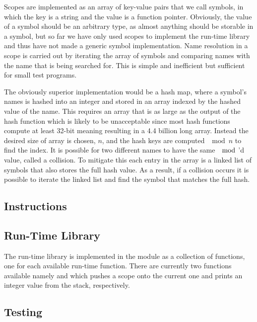 Scopes are implemented as an array of key-value pairs that we call symbols, in
which the key is a string and the value is a function pointer. Obviously, the
value of a symbol should be an arbitrary type, as almost anything should be
storable in a symbol, but so far we have only used scopes to implement the
run-time library and thus have not made a generic symbol implementation. Name
resolution in a scope is carried out by iterating the array of symbols and
comparing names with the name that is being searched for. This is simple and
inefficient but sufficient for small test programs.

The obviously superior implementation would be a hash map, where a symbol's
names is hashed into an integer and stored in an array indexed by the hashed
value of the name. This requires an array that is as large as the output of the
hash function which is likely to be unacceptable since most hash functions
compute at least 32-bit meaning resulting in a 4.4 billion long array. Instead
the desired size of array is chosen, $n$, and the hash keys are computed
$\mod n$ to find the index. It is possible for two different names to have the
same $\mod$'d value, called a collision. To mitigate this each entry in the
array is a linked list of symbols that also stores the full hash value. As a
result, if a collision occurs it is possible to iterate the linked list and find
the symbol that matches the full hash.

\subsection{Instructions}
\label{sec:implementation:instr}


\subsection{Run-Time Library}

The run-time library is implemented in the  module as a
collection of functions, one for each available run-time function. There are
currently two functions available namely  and 
which pushes a scope onto the current one and prints an integer value from the
stack, respectively.

\subsection{Testing}








